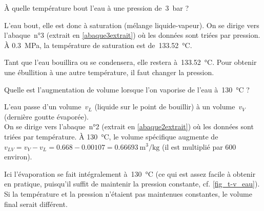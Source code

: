 			\begin{anexample}
			
			À quelle température bout l’eau à une pression de~\SI{3}{\bar} ?
			
				\begin{answer}
				L’eau bout, elle est donc à saturation (mélange liquide-vapeur). On se dirige vers l’abaque~n°3 (extrait en \cref{abaque3extrait}) où les données sont triées par pression. À \SI{0,3}{\mega\pascal}, la température de saturation est de~\SI{133,52}{\degreeCelsius}.
					\begin{remark}Tant que l’eau bouillira ou se condensera, elle restera à~\SI{133,52}{\degreeCelsius}. Pour obtenir une ébullition à une autre température, il faut changer la pression.\end{remark}\end{answer}
			\end{anexample}


			\begin{anexample}
			
			Quelle est l’augmentation de volume lorsque l’on vaporise de l’eau à~\SI{130}{\degreeCelsius} ?
			
				\begin{answer}
				L’eau passe d’un volume~$v_L$ (liquide sur le point de bouillir) à un volume~$v_V$ (dernière goutte évaporée).\\
				On se dirige vers l’abaque~n°2 (extrait en \cref{abaque2extrait}) où les données sont triées par température. À \SI{130}{\degreeCelsius}, le volume spécifique augmente de $v_{LV} = v_V - v_L = \num{0,668} - \num{0,00107} = \SI{0,66693}{\metre\cubed\per\kilogram}$ (il est multiplié par \num{600} environ).
				\begin{remark}Ici l’évaporation se fait intégralement à~\SI{130}{\degreeCelsius} (ce qui est assez facile à obtenir en pratique, puisqu’il suffit de maintenir la pression constante, cf. \cref{fig_t-v_eau}). Si la température et la pression n’étaient pas maintenues constantes, le volume final serait différent.\end{remark}\end{answer}
			\end{anexample}

